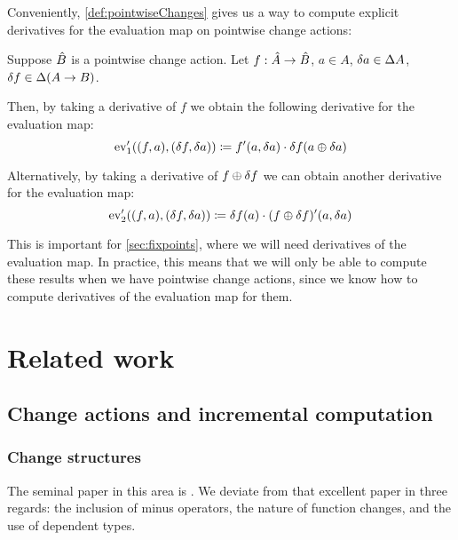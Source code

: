 Conveniently, \cref{def:pointwiseChanges} gives us a way to compute explicit derivatives for
the evaluation map on pointwise change actions:

\begin{prop}
\label{prop:evDerivatives}
  Suppose $\hat{B}$ is a pointwise change action. Let
  $f: \hat{A} \rightarrow \hat{B}$,
  $a \in A$, $\delta a \in \Delta A$,
  $\delta f \in \Delta (A \rightarrow B)$.

  Then, by taking a derivative of $f$ we obtain the following derivative for the evaluation map:
  \begin{displaymath}
    \operatorname{ev}'_1((f, a), (\delta f, \delta a)) \coloneqq f'(a, \delta a) \cdot \delta f(a \oplus \delta a)
  \end{displaymath}

  Alternatively, by taking a derivative of $f \oplus \delta f$ we can obtain another derivative
  for the evaluation map:
  \begin{displaymath}
    \operatorname{ev}'_2((f, a), (\delta f, \delta a)) \coloneqq \delta f(a) \cdot (f \oplus \delta f)'(a, \delta a)
  \end{displaymath}
\end{prop}

This is important for \cref{sec:fixpoints}, where we will need derivatives of
the evaluation map. In practice, this means that we will only be able to compute
these results when we have pointwise change actions, since we know how to
compute derivatives of the evaluation map for them.

\section{Related work}

\subsection{Change actions and incremental computation}

\subsubsection{Change structures}
\label{sec:relatedChangeStructures}

The seminal paper in this area is \textcite{cai2014changes}. We deviate from
that excellent paper in three regards: the
inclusion of minus operators, the nature of function changes, and the use of
dependent types.

